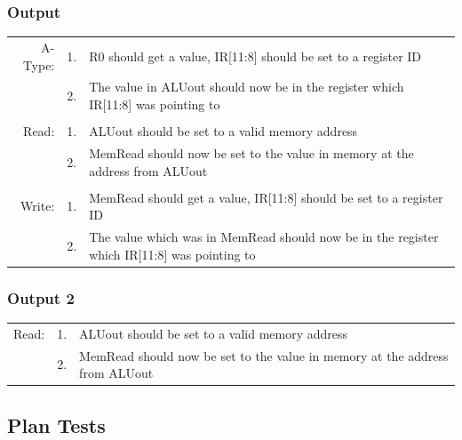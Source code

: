 \documentclass{article}
\begin{document}
		\subsubsection{Output}
			\begin{tabular}{ r  r  p{13cm} }
				A-Type: & 1. & R0 should get a value, IR[11:8] should be set to a register ID\\
				        & 2. & The value in ALUout should now be in the register which IR[11:8] was pointing to\\
				        &    & \\
				  Read: & 1. & ALUout should be set to a valid memory address\\
				        & 2. & MemRead should now be set to the value in memory at the address from ALUout\\
				        &    & \\
				 Write: & 1. & MemRead should get a value, IR[11:8] should be set to a register ID\\\
				        & 2. & The value which was in MemRead should now be in the register which IR[11:8] was pointing to\\
			\end{tabular}
		\subsubsection{Output 2}
			\begin{tabular}{ r  r  p{13cm} }
				Read: & 1. & ALUout should be set to a valid memory address\\
				      & 2. & MemRead should now be set to the value in memory at the address from ALUout\\
			\end{tabular}
	\subsection{Plan Tests}
\end{document}
